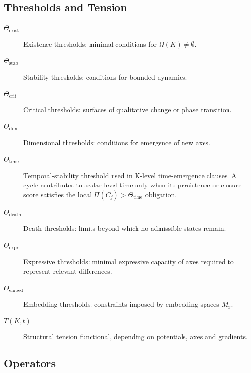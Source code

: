 \subsection{Thresholds and Tension}

\begin{description}
  \item[\(\Theta_{\mathrm{exist}}\)] Existence thresholds:
        minimal conditions for \(\Omega(K)\neq\emptyset\).
  \item[\(\Theta_{\mathrm{stab}}\)] Stability thresholds:
        conditions for bounded dynamics.
  \item[\(\Theta_{\mathrm{crit}}\)] Critical thresholds:
        surfaces of qualitative change or phase transition.
  \item[\(\Theta_{\mathrm{dim}}\)] Dimensional thresholds:
        conditions for emergence of new axes.
  \item[\(\Theta_{\mathrm{time}}\)] Temporal-stability threshold used in
        K-level time-emergence clauses. A cycle contributes to scalar level-time
        only when its persistence or closure score satisfies the local
        \(\Pi(C_j)>\Theta_{\mathrm{time}}\) obligation.
  \item[\(\Theta_{\mathrm{death}}\)] Death thresholds:
        limits beyond which no admissible states remain.
  \item[\(\Theta_{\mathrm{expr}}\)] Expressive thresholds:
        minimal expressive capacity of axes required to represent relevant
        differences.
  \item[\(\Theta_{\mathrm{embed}}\)] Embedding thresholds:
        constraints imposed by embedding spaces \(M_x\).
  \item[\(T(K,t)\)] Structural tension functional, depending on potentials,
        axes and gradients.
\end{description}

\subsection{Operators}

